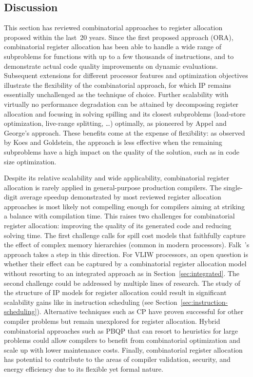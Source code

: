 \documentclass[acmsmall,authorversion,nonacm]{acmart}
\begin{document}
\subsection{Discussion}
\label{sec:register-allocation-discussion}

This section has reviewed combinatorial approaches to register
allocation proposed within the last~20 years.
Since the first proposed approach (ORA), combinatorial register
allocation has been able to handle a wide range of subproblems for
functions with up to a few thousands of instructions, and to
demonstrate actual code quality improvements on dynamic evaluations.
Subsequent extensions for different processor features and
optimization objectives illustrate the flexibility of the
combinatorial approach, for which IP remains essentially unchallenged
as the technique of choice.
Further scalability with virtually no performance degradation can be
attained by decomposing register allocation and focusing in solving
spilling and its closest subproblems (load-store optimization,
live-range splitting, \dots) optimally, as pioneered by Appel and
George's approach.
These benefits come at the expense of flexibility: as observed by Koes
and Goldstein, the approach is less effective when the remaining
subproblems have a high impact on the quality of the solution, such as
in code size optimization.

Despite its relative scalability and wide applicability, combinatorial
register allocation is rarely applied in general-purpose production
compilers.
The single-digit average speedup demonstrated by most reviewed
register allocation approaches is most likely not compelling enough
for compilers aiming at striking a balance with compilation time.
This raises two challenges for combinatorial register allocation:
improving the quality of its generated code and reducing solving time.
The first challenge calls for spill cost models that faithfully
capture the effect of complex memory hierarchies (common in modern
processors).
Falk~\etal{}'s approach takes a step in this direction.
For VLIW processors, an open question is whether their effect can be
captured by a combinatorial register allocation model without
resorting to an integrated approach as in
Section~\ref{sec:integrated}.
The second challenge could be addressed by multiple lines of research.
The study of the structure of IP models for register allocation could
result in significant scalability gains like in instruction scheduling
(see Section~\ref{sec:instruction-scheduling}).
Alternative techniques such as CP have proven successful for other
compiler problems but remain unexplored for register allocation.
Hybrid combinatorial approaches such as PBQP that can resort to
heuristics for large problems could allow compilers to benefit from
combinatorial optimization and scale up with lower maintenance costs.
Finally, combinatorial register allocation has potential to contribute
to the areas of compiler validation, security, and energy efficiency
due to its flexible yet formal nature.
\end{document}
